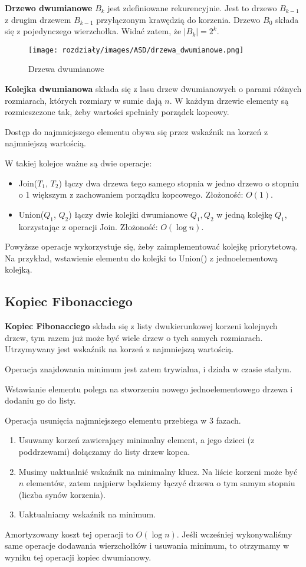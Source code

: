 \textbf{Drzewo dwumianowe} $B_k$ jest zdefiniowane rekurencyjnie. Jest to drzewo $B_{k - 1}$ z drugim drzewem $B_{k - 1}$ przyłączonym krawędzią do korzenia.
Drzewo $B_0$ składa się z pojedynczego wierzchołka. Widać zatem, że $|B_k| = 2^k$.

\begin{figure}[H]
    \centering
    \texttt{[image: rozdziały/images/ASD/drzewa\_dwumianowe.png]}
    \caption{Drzewa dwumianowe}
\end{figure}

\textbf{Kolejka dwumianowa} składa się z lasu drzew dwumianowych o parami różnych rozmiarach, których rozmiary w sumie dają $n$. W każdym drzewie elementy są rozmieszczone tak, żeby wartości spełniały porządek kopcowy.

Dostęp do najmniejszego elementu obywa się przez wskaźnik na korzeń z najmniejszą wartością.

W takiej kolejce ważne są dwie operacje:
\begin{itemize}
    \item Join($T_1$, $T_2$) łączy dwa drzewa tego samego stopnia w jedno drzewo o stopniu o 1 większym z zachowaniem porządku kopcowego. Złożoność: $O(1)$.
    \item Union($Q_1$, $Q_2$) łączy dwie kolejki dwumianowe $Q_1, Q_2$ w jedną kolejkę $Q_1$, korzystając z operacji Join. Złożoność: $O(\log n)$.
\end{itemize}

Powyższe operacje wykorzystuje się, żeby zaimplementować kolejkę priorytetową. Na przykład, wstawienie elementu do kolejki to Union() z jednoelementową kolejką.

\subsection{Kopiec Fibonacciego}

\textbf{Kopiec Fibonacciego} składa się z listy dwukierunkowej korzeni kolejnych drzew, tym razem już może być wiele drzew o tych samych rozmiarach. Utrzymywany jest wskaźnik na korzeń z najmniejszą wartością.

Operacja znajdowania minimum jest zatem trywialna, i działa w czasie stałym.

Wstawianie elementu polega na stworzeniu nowego jednoelementowego drzewa i dodaniu go do listy.

Operacja usunięcia najmniejszego elementu przebiega w 3 fazach.
\begin{enumerate}
    \item Usuwamy korzeń zawierający minimalny element, a jego dzieci (z poddrzewami) dołączamy do listy drzew kopca.
    \item Musimy uaktualnić wskaźnik na minimalny klucz. Na liście korzeni może być $n$ elementów, zatem najpierw będziemy łączyć drzewa o tym samym stopniu (liczba synów korzenia).
    \item Uaktualniamy wskaźnik na minimum.
\end{enumerate}
Amortyzowany koszt tej operacji to $O(\log n)$. Jeśli wcześniej wykonywaliśmy same operacje dodawania wierzchołków i usuwania minimum, to otrzymamy w wyniku tej operacji kopiec dwumianowy.

